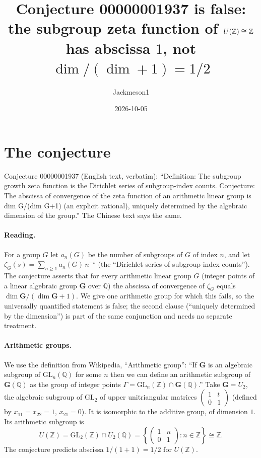 \documentclass[11pt]{article}
\title{Conjecture 00000001937 is false:\\ the subgroup zeta function of $U(\Z)\cong\Z$ has abscissa $1$, not $\dim/(\dim+1)=1/2$}
\author{Jackmeson1}
\date{2026-10-05}
\theoremstyle{definition}
\newcommand{\Z}{\mathbb Z}
\newcommand{\Q}{\mathbb Q}
\begin{document}
\maketitle

\section{The conjecture}
Conjecture 00000001937 (English text, verbatim): ``Definition: The subgroup growth zeta function
is the Dirichlet series of subgroup-index counts. Conjecture: The abscissa of convergence of the
zeta function of an arithmetic linear group is dim G/(dim G+1) (an explicit rational), uniquely
determined by the algebraic dimension of the group.'' The Chinese text says the same.

\paragraph{Reading.} For a group $G$ let $a_n(G)$ be the number of subgroups of $G$ of index
$n$, and let $\zeta_G(s)=\sum_{n\ge1}a_n(G)\,n^{-s}$ (the ``Dirichlet series of subgroup-index
counts''). The conjecture asserts that for every arithmetic linear group $G$ (integer points of
a linear algebraic group $\mathbf G$ over $\Q$) the abscissa of convergence of $\zeta_G$ equals
$\dim\mathbf G/(\dim\mathbf G+1)$. We give one arithmetic group for which this fails, so the
universally quantified statement is false; the second clause (``uniquely determined by the
dimension'') is part of the same conjunction and needs no separate treatment.

\paragraph{Arithmetic groups.} We use the definition from Wikipedia, ``Arithmetic group'': ``If
$\mathbf G$ is an algebraic subgroup of $\mathrm{GL}_n(\Q)$ for some $n$ then we can define an
arithmetic subgroup of $\mathbf G(\Q)$ as the group of integer points
$\Gamma=\mathrm{GL}_n(\Z)\cap\mathbf G(\Q)$.'' Take $\mathbf G=U_2$, the algebraic subgroup of
$\mathrm{GL}_2$ of upper unitriangular matrices $\left(\begin{smallmatrix}1&t\\0&1\end{smallmatrix}\right)$
(defined by $x_{11}=x_{22}=1$, $x_{21}=0$). It is isomorphic to the additive group, of dimension
$1$. Its arithmetic subgroup is
\[ U(\Z)=\mathrm{GL}_2(\Z)\cap U_2(\Q)=\left\{\begin{pmatrix}1&n\\0&1\end{pmatrix}:n\in\Z\right\}\cong\Z. \]
The conjecture predicts abscissa $1/(1+1)=1/2$ for $U(\Z)$.
\end{document}
